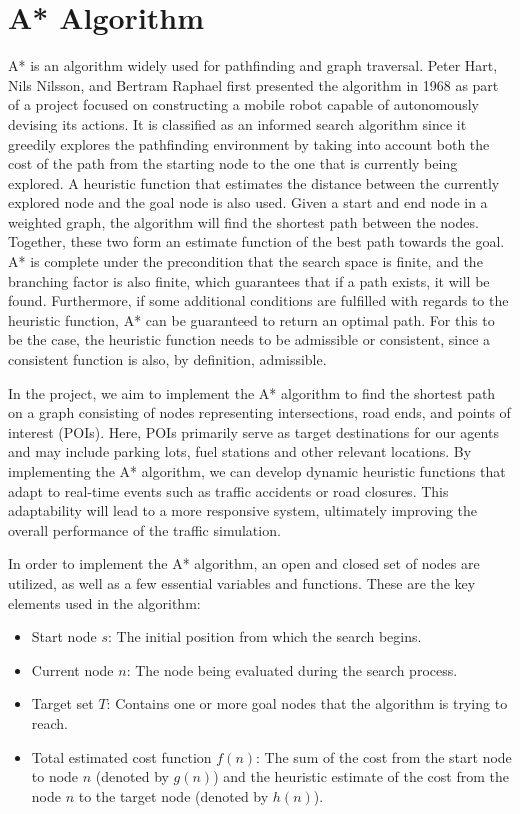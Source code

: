 \section{A* Algorithm}
    A* is an algorithm widely used for pathfinding and graph traversal. Peter Hart, Nils Nilsson, and Bertram Raphael first presented the algorithm in 1968 as part of a project focused on constructing a mobile robot capable of autonomously devising its actions\cite{hart1968formal}. It is classified as an informed search algorithm since it greedily explores the pathfinding environment by taking into account both the cost of the path from the starting node to the one that is currently being explored. A heuristic function that estimates the distance between the currently explored node and the goal node is also used\cite{russell2016artificial}. Given a start and end node in a weighted graph, the algorithm will find the shortest path between the nodes. Together, these two form an estimate function of the best path towards the goal. A* is complete under the precondition that the search space is finite, and the branching factor is also finite, which guarantees that if a path exists, it will be found. Furthermore, if some additional conditions are fulfilled with regards to the heuristic function, A* can be guaranteed to return an optimal path. For this to be the case, the heuristic function needs to be admissible or consistent, since a consistent function is also, by definition, admissible\cite{dechter1985generalized}.

    In the project, we aim to implement the A* algorithm to find the shortest path on a graph consisting of nodes representing intersections, road ends, and points of interest (POIs). Here, POIs primarily serve as target destinations for our agents and may include parking lots, fuel stations and other relevant locations. By implementing the A* algorithm, we can develop dynamic heuristic functions that adapt to real-time events such as traffic accidents or road closures. This adaptability will lead to a more responsive system, ultimately improving the overall performance of the traffic simulation. 
    
    In order to implement the A* algorithm, an open and closed set of nodes are utilized, as well as a few essential variables and functions. These are the key elements used in the algorithm:

    \begin{itemize}
        \item Start node $s$: The initial position from which the search begins.
        \item Current node $n$: The node being evaluated during the search process.
        \item Target set $T$: Contains one or more goal nodes that the algorithm is trying to reach.
        \item Total estimated cost function $f(n)$: The sum of the cost from the start node to node $n$ (denoted by $g(n)$) and the heuristic estimate of the cost from the node $n$ to the target node (denoted by $h(n)$).
    \end{itemize}

